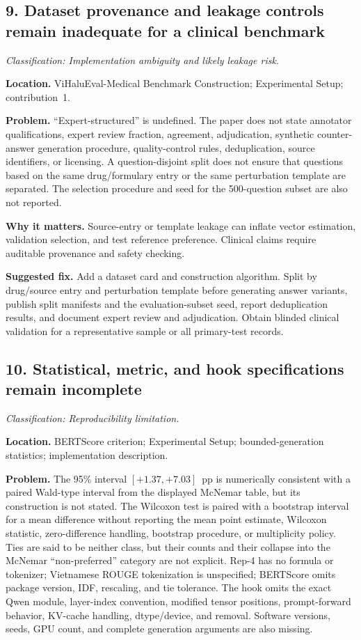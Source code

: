 \documentclass[11pt]{article}
\newcommand{\findinglabel}[1]{\textbf{#1}}
\newcommand{\classification}[1]{\textit{Classification: #1.}}
\begin{document}
\subsection*{9. Dataset provenance and leakage controls remain inadequate for a clinical benchmark}

\classification{Implementation ambiguity and likely leakage risk}

\findinglabel{Location.} ViHaluEval-Medical Benchmark Construction; Experimental Setup; contribution~1.

\findinglabel{Problem.} ``Expert-structured'' is undefined.  The paper does not state annotator qualifications, expert review fraction, agreement, adjudication, synthetic counter-answer generation procedure, quality-control rules, deduplication, source identifiers, or licensing.  A question-disjoint split does not ensure that questions based on the same drug/formulary entry or the same perturbation template are separated.  The selection procedure and seed for the 500-question subset are also not reported.

\findinglabel{Why it matters.} Source-entry or template leakage can inflate vector estimation, validation selection, and test reference preference.  Clinical claims require auditable provenance and safety checking.

\findinglabel{Suggested fix.} Add a dataset card and construction algorithm.  Split by drug/source entry and perturbation template before generating answer variants, publish split manifests and the evaluation-subset seed, report deduplication results, and document expert review and adjudication.  Obtain blinded clinical validation for a representative sample or all primary-test records.

\subsection*{10. Statistical, metric, and hook specifications remain incomplete}

\classification{Reproducibility limitation}

\findinglabel{Location.} BERTScore criterion; Experimental Setup; bounded-generation statistics; implementation description.

\findinglabel{Problem.} The 95\% interval $[+1.37,+7.03]$~pp is numerically consistent with a paired Wald-type interval from the displayed McNemar table, but its construction is not stated.  The Wilcoxon test is paired with a bootstrap interval for a mean difference without reporting the mean point estimate, Wilcoxon statistic, zero-difference handling, bootstrap procedure, or multiplicity policy.  Ties are said to be neither class, but their counts and their collapse into the McNemar ``non-preferred'' category are not explicit.  Rep-4 has no formula or tokenizer; Vietnamese ROUGE tokenization is unspecified; BERTScore omits package version, IDF, rescaling, and tie tolerance.  The hook omits the exact Qwen module, layer-index convention, modified tensor positions, prompt-forward behavior, KV-cache handling, dtype/device, and removal.  Software versions, seeds, GPU count, and complete generation arguments are also missing.
\end{document}
